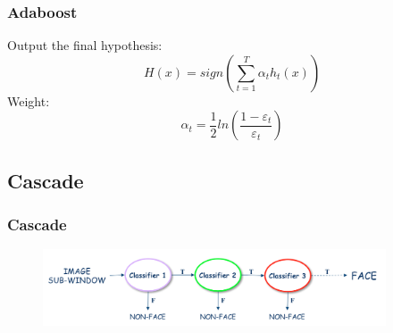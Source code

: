 \documentclass[10pt]{beamer}
\begin{document}
\begin{frame}
    \frametitle{Adaboost}
   \large Output the final hypothesis:
   \begin{displaymath}
   H(x) = sign(\sum_{t=1}^T  \alpha_t h_t(x))  
   \end{displaymath}
   \newline
   \large Weight:
   \newline
   \begin{displaymath}
   \alpha_t =  \frac{1}{2} ln (\frac{1-\varepsilon_t}{\varepsilon_t})
   \end{displaymath}
\end{frame}



\subsection{Cascade}
\begin{frame}
   \frametitle{Cascade}
   \begin{figure}[!ht]
   \centering
   \includegraphics[width=4.0in]{AAUgraphics/liucheng.png}
   \end{figure}
\end{frame}


{\aauwavesbg
\begin{frame}
\end{frame}}
\end{document}
